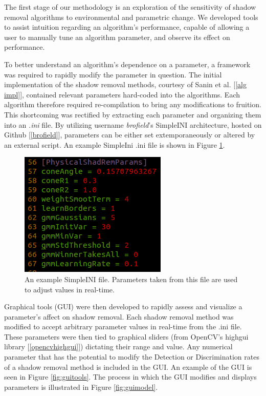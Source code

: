The first stage of our methodology is an exploration of the sensitivity of shadow removal algorithms to environmental and parametric change. We developed tools to assist intuition regarding an algorithm's performance, capable of allowing a user to manually tune an algorithm parameter, and observe its effect on performance.

To better understand an algorithm's dependence on a parameter, a framework was required to rapidly modify the parameter in question. The initial implementation of the shadow removal methods, courtesy of Sanin et al. [\ref{alg impl}], contained relevant parameters hard-coded into the algorithms. Each algorithm therefore required re-compilation to bring any modifications to fruition. This shortcoming was rectified by extracting each parameter and organizing them into an \textit{.ini} file. By utilizing username \textit{brofield}'s SimpleINI architecture, hosted on Github [\ref{brofield}], parameters can be either set extemporaneously or altered by an external script. An example SimpleIni .ini file is shown in Figure \ref{fig:simpleini}.

\begin{figure}
  \centering
  \includegraphics[width=.5\linewidth]{figures/simpleini.png}
  \caption{An example SimpleINI file. Parameters taken from this file are used to adjust values in real-time.}
  \label{fig:simpleini}
\end{figure}

Graphical tools (GUI) were then developed to rapidly assess and visualize a parameter's affect on shadow removal. Each shadow removal method was modified to accept arbitrary parameter values in real-time from the .ini file. These parameters were then tied to graphical sliders (from OpenCV's highgui library [\ref{opencvhighgui}]) dictating their range and value. Any numerical parameter that has the potential to modify the Detection or Discrimination rates of a shadow removal method is included in the GUI. An example of the GUI is seen in Figure \ref{fig:guitools}. The process in which the GUI modifies and displays parameters is illustrated in Figure \ref{fig:guimodel}.

